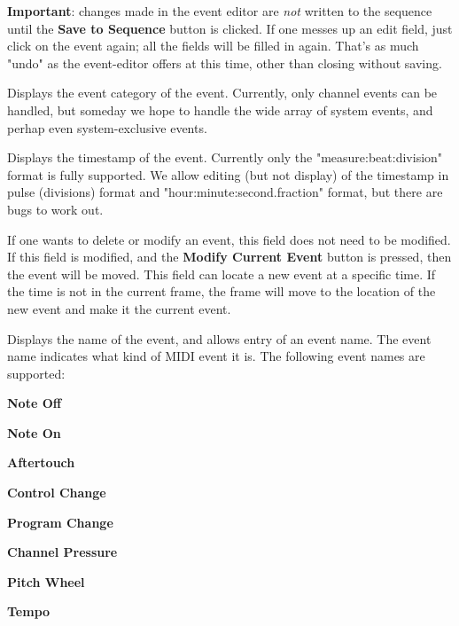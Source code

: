    \textbf{Important}: changes made in the event editor
   are \textsl{not} written to the sequence until the \textbf{Save to Sequence}
   button is clicked.  If one messes up an edit field, just click on the event
   again; all the fields will be filled in again.
   That's as much "undo" as the event-editor offers at this time, other than
   closing without saving.

   \setcounter{ItemCounter}{0}      %

   Displays the event category of the event.  Currently, only channel events
   can be handled, but someday we hope to handle the wide array of system
   events, and perhap even system-exclusive events.

   Displays the timestamp of the event.  Currently only the
   "measure:beat:division" format is fully supported.
   We allow editing (but not display) of the timestamp in
   pulse (divisions) format and "hour:minute:second.fraction" format, but
   there are bugs to work out.

   If one wants to delete or modify an event, this field does not need to be
   modified.  If this field is modified, and the \textbf{Modify Current Event}
   button is pressed, then the event will be moved.  This field can locate
   a new event at a specific time.  If the time is not in the current frame,
   the frame will move to the location of the new event and make it the current
   event.

   Displays the name of the event, and allows entry of an event name.
   The event name indicates what kind of MIDI event it is. 
   The following event names are supported:

   \begin{enumber}
      \item \textbf{Note Off}
      \item \textbf{Note On}
      \item \textbf{Aftertouch}
      \item \textbf{Control Change}
      \item \textbf{Program Change}
      \item \textbf{Channel Pressure}
      \item \textbf{Pitch Wheel}
      \item \textbf{Tempo}
   \end{enumber}


